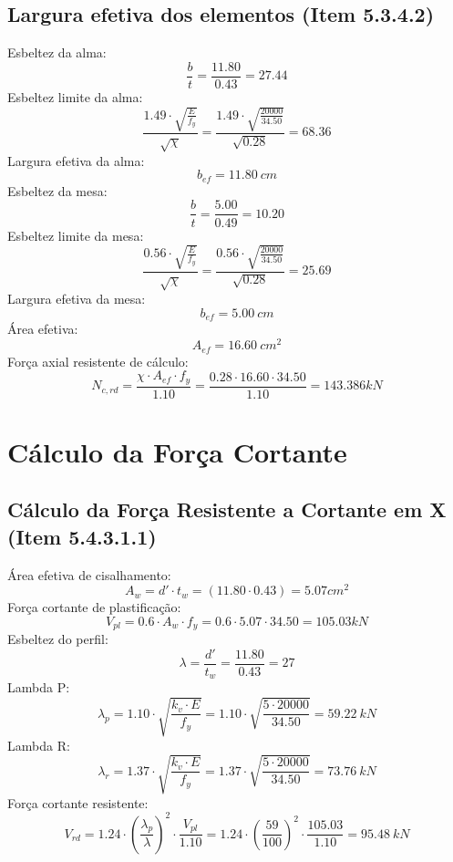 \documentclass{article}%
\begin{document}
%
\subsection{Largura efetiva dos elementos (Item 5.3.4.2)}%
\label{subsec:Larguraefetivadoselementos(Item5.3.4.2)}%
Esbeltez da alma:%
\[%
\frac{b}{t} = \frac{11.80}{0.43} = 27.44 
%
\]%
Esbeltez limite da alma:%
\[%
\frac{1.49 \cdot \sqrt{\frac{E}{f_y}}}{\sqrt{\chi}}  = \frac{1.49 \cdot \sqrt{\frac{20000}{34.50}}}{\sqrt{0.28}}  = 68.36 
%
\]%
Largura efetiva da alma:%
\[%
 b_{ef} = 11.80 \ cm%
\]%
Esbeltez da mesa:%
\[%
\frac{b}{t} = \frac{5.00}{0.49} = 10.20 
%
\]%
Esbeltez limite da mesa:%
\[%
\frac{0.56 \cdot \sqrt{\frac{E}{f_y}}}{\sqrt{\chi}}  = \frac{0.56 \cdot \sqrt{\frac{20000}{34.50}}}{\sqrt{0.28}}  = 25.69 
%
\]%
Largura efetiva da mesa:%
\[%
 b_{ef} = 5.00 \ cm%
\]%
Área efetiva:%
\[%
 A_{ef} = 16.60 \ {cm}^2%
\]%
Força axial resistente de cálculo:%
\[%
 N_{c,rd} = \frac{\chi \cdot A_{ef} \cdot f_y}{1.10}  = \frac{0.28 \cdot 16.60 \cdot 34.50}{1.10}  = 143.386   kN 
%
\]

%
\section{Cálculo da Força Cortante}%
\label{sec:ClculodaForaCortante}%

%
\subsection{Cálculo da Força Resistente a Cortante em X (Item 5.4.3.1.1)}%
\label{subsec:ClculodaForaResistenteaCortanteemX(Item5.4.3.1.1)}%
Área efetiva de cisalhamento:%
\[%
A_w = d' \cdot t_w = (11.80 \cdot 0.43) = 5.07    {cm}^2%
\]%
Força cortante de plastificação:%
\[%
V_{pl} = 0.6 \cdot A_w \cdot f_y = 0.6 \cdot 5.07 \cdot 34.50 = 105.03    kN%
\]%
Esbeltez do perfil:%
\[%
\lambda = \frac{d'}{t_w} = \frac{11.80}{0.43} = 27%
\]%
Lambda P:%
\[%
\lambda_p = 1.10 \cdot \sqrt{\frac{{k_v \cdot E}}{{f_y}}} = 1.10 \cdot \sqrt{\frac{{5 \cdot 20000}}{{34.50}}} = 59.22   ~   kN%
\]%
Lambda R:%
\[%
\lambda_r = 1.37 \cdot \sqrt{\frac{{k_v \cdot E}}{{f_y}}} = 1.37 \cdot \sqrt{\frac{{5 \cdot 20000}}{{34.50}}} = 73.76   ~   kN%
\]%
Força cortante resistente:%
\[%
V_{rd} = 1.24 \cdot \left(\frac{\lambda_p}{\lambda}\right)^2 \cdot \frac{V_{pl}}{1.10}  = 1.24 \cdot \left(\frac{59}{100}\right)^2 \cdot \frac{105.03}{1.10} = 95.48   ~   kN%
\]

%
\end{document}
